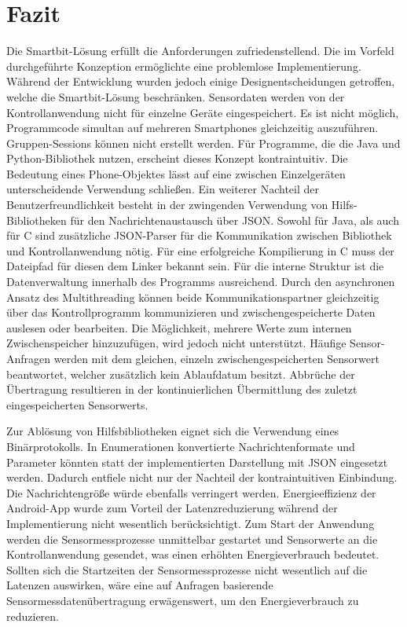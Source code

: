 \documentclass[11pt,a4paper]{report}
\begin{document}
\chapter{Fazit}\label{chap:fazit}
Die Smartbit-Lösung erfüllt die Anforderungen zufriedenstellend.
Die im Vorfeld durchgeführte Konzeption ermöglichte eine problemlose Implementierung.
Während der Entwicklung wurden jedoch einige Designentscheidungen getroffen, welche die Smartbit-Lösung beschränken.
Sensordaten werden von der Kontrollanwendung nicht für einzelne Geräte eingespeichert.
Es ist nicht möglich, Programmcode simultan auf mehreren Smartphones gleichzeitig auszuführen.
Gruppen-Sessions können nicht erstellt werden.
Für Programme, die die Java und Python-Bibliothek nutzen, erscheint dieses Konzept kontraintuitiv.
Die Bedeutung eines Phone-Objektes lässt auf eine zwischen Einzelgeräten unterscheidende Verwendung schließen.
Ein weiterer Nachteil der Benutzerfreundlichkeit besteht in der zwingenden Verwendung von Hilfs-Bibliotheken für den Nachrichtenaustausch über JSON.
Sowohl für Java, als auch für C sind zusätzliche JSON-Parser für die Kommunikation zwischen Bibliothek und Kontrollanwendung nötig.
Für eine erfolgreiche Kompilierung in C muss der Dateipfad für diesen dem Linker bekannt sein.
Für die interne Struktur ist die Datenverwaltung innerhalb des Programms ausreichend.
Durch den asynchronen Ansatz des Multithreading können beide Kommunikationspartner gleichzeitig über das Kontrollprogramm kommunizieren und zwischengespeicherte Daten auslesen oder bearbeiten.
Die Möglichkeit, mehrere Werte zum internen Zwischenspeicher hinzuzufügen, wird jedoch nicht unterstützt.
Häufige Sensor-Anfragen werden mit dem gleichen, einzeln zwischengespeicherten Sensorwert beantwortet, welcher zusätzlich kein Ablaufdatum besitzt.
Abbrüche der Übertragung resultieren in der kontinuierlichen Übermittlung des zuletzt eingespeicherten Sensorwerts.

Zur Ablösung von Hilfsbibliotheken eignet sich die Verwendung eines Binärprotokolls.
In Enumerationen konvertierte Nachrichtenformate und Parameter könnten statt der implementierten Darstellung mit JSON eingesetzt werden.
Dadurch entfiele nicht nur der Nachteil der kontraintuitiven Einbindung.
Die Nachrichtengröße würde ebenfalls verringert werden.
Energieeffizienz der Android-App wurde zum Vorteil der Latenzreduzierung während der Implementierung nicht wesentlich berücksichtigt.
Zum Start der Anwendung werden die Sensormessprozesse unmittelbar gestartet und Sensorwerte an die Kontrollanwendung gesendet, was einen erhöhten Energieverbrauch bedeutet.
Sollten sich die Startzeiten der Sensormessprozesse nicht wesentlich auf die Latenzen auswirken, wäre eine auf Anfragen basierende Sensormessdatenübertragung erwägenswert, um den Energieverbrauch zu reduzieren.
\end{document}
